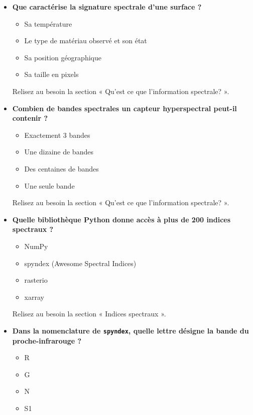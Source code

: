 \documentclass[
  french,
  11pt,
  letterpaper,
  open=any,
  twoside=false,
  french]{scrbook}
\providecommand{\tightlist}{%
  \setlength{\itemsep}{0pt}\setlength{\parskip}{0pt}}
\begin{document}
\begin{itemize}
\item
  \textbf{Que caractérise la signature spectrale d'une surface ?}

  \begin{itemize}
  \tightlist
  \item
    Sa température
  \item
    Le type de matériau observé et son état
  \item
    Sa position géographique
  \item
    Sa taille en pixels
  \end{itemize}

  Relisez au besoin la section « Qu'est ce que l'information spectrale?
  ».
\item
  \textbf{Combien de bandes spectrales un capteur hyperspectral peut-il
  contenir ?}

  \begin{itemize}
  \tightlist
  \item
    Exactement 3 bandes
  \item
    Une dizaine de bandes
  \item
    Des centaines de bandes
  \item
    Une seule bande
  \end{itemize}

  Relisez au besoin la section « Qu'est ce que l'information spectrale?
  ».
\item
  \textbf{Quelle bibliothèque Python donne accès à plus de 200 indices
  spectraux ?}

  \begin{itemize}
  \tightlist
  \item
    NumPy
  \item
    spyndex (Awesome Spectral Indices)
  \item
    rasterio
  \item
    xarray
  \end{itemize}

  Relisez au besoin la section « Indices spectraux ».
\item
  \textbf{Dans la nomenclature de \texttt{spyndex}, quelle lettre
  désigne la bande du proche-infrarouge ?}

  \begin{itemize}
  \tightlist
  \item
    R
  \item
    G
  \item
    N
  \item
    S1
  \end{itemize}


\end{itemize}
\end{document}

